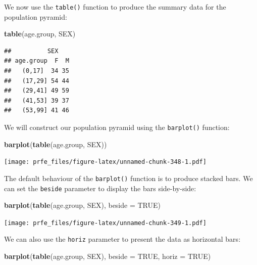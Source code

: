 \documentclass[12pt,]{book}
\newenvironment{Shaded}{\begin{snugshade}}{\end{snugshade}}
\newcommand{\KeywordTok}[1]{\textcolor[rgb]{0.13,0.29,0.53}{\textbf{#1}}}
\newcommand{\DataTypeTok}[1]{\textcolor[rgb]{0.13,0.29,0.53}{#1}}
\newcommand{\OtherTok}[1]{\textcolor[rgb]{0.56,0.35,0.01}{#1}}
\newcommand{\NormalTok}[1]{#1}
\theoremstyle{definition}
\theoremstyle{definition}
\theoremstyle{definition}
\theoremstyle{remark}
\begin{document}
We now use the \texttt{table()} function to produce the summary data for
the population pyramid:

\begin{Shaded}
\begin{Highlighting}[]
\KeywordTok{table}\NormalTok{(age.group, SEX)}
\end{Highlighting}
\end{Shaded}

\begin{verbatim}
##          SEX
## age.group  F  M
##   (0,17]  34 35
##   (17,29] 54 44
##   (29,41] 49 59
##   (41,53] 39 37
##   (53,99] 41 46
\end{verbatim}

We will construct our population pyramid using the \texttt{barplot()}
function:

\begin{Shaded}
\begin{Highlighting}[]
\KeywordTok{barplot}\NormalTok{(}\KeywordTok{table}\NormalTok{(age.group, SEX))}
\end{Highlighting}
\end{Shaded}

\texttt{[image: prfe\_files/figure-latex/unnamed-chunk-348-1.pdf]}

The default behaviour of the \texttt{barplot()} function is to produce
stacked bars. We can set the \texttt{beside} parameter to display the
bars side-by-side:

\begin{Shaded}
\begin{Highlighting}[]
\KeywordTok{barplot}\NormalTok{(}\KeywordTok{table}\NormalTok{(age.group, SEX), }\DataTypeTok{beside =} \OtherTok{TRUE}\NormalTok{)}
\end{Highlighting}
\end{Shaded}

\texttt{[image: prfe\_files/figure-latex/unnamed-chunk-349-1.pdf]}

We can also use the \texttt{horiz} parameter to present the data as
horizontal bars:

\begin{Shaded}
\begin{Highlighting}[]
\KeywordTok{barplot}\NormalTok{(}\KeywordTok{table}\NormalTok{(age.group, SEX), }\DataTypeTok{beside =} \OtherTok{TRUE}\NormalTok{, }\DataTypeTok{horiz =} \OtherTok{TRUE}\NormalTok{)}
\end{Highlighting}
\end{Shaded}
\end{document}
